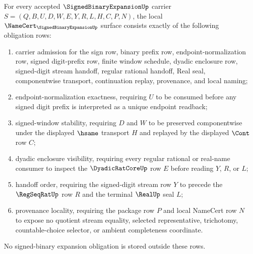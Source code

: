 \begin{theorem}
\label{thm:signed-binary-expansion-namecert-obligations}
For every accepted $\SignedBinaryExpansionUp$ carrier $S=(Q,B,U,D,W,E,Y,R,L,H,C,P,N)$, the local $\NameCert_{\SignedBinaryExpansionUp}$ surface consists exactly of the following obligation rows:
\begin{enumerate}
\item carrier admission for the sign row, binary prefix row, endpoint-normalization row, signed digit-prefix row, finite window schedule, dyadic enclosure row, signed-digit stream handoff, regular rational handoff, Real seal, componentwise transport, continuation replay, provenance, and local naming;
\item endpoint-normalization exactness, requiring $U$ to be consumed before any signed digit prefix is interpreted as a unique endpoint readback;
\item signed-window stability, requiring $D$ and $W$ to be preserved componentwise under the displayed $\hsame$ transport $H$ and replayed by the displayed $\Cont$ row $C$;
\item dyadic enclosure visibility, requiring every regular rational or real-name consumer to inspect the $\DyadicRatCoreUp$ row $E$ before reading $Y$, $R$, or $L$;
\item handoff order, requiring the signed-digit stream row $Y$ to precede the $\RegSeqRatUp$ row $R$ and the terminal $\RealUp$ seal $L$;
\item provenance locality, requiring the package row $P$ and local NameCert row $N$ to expose no quotient stream equality, selected representative, trichotomy, countable-choice selector, or ambient completeness coordinate.
\end{enumerate}
No signed-binary expansion obligation is stored outside these rows.
\end{theorem}
